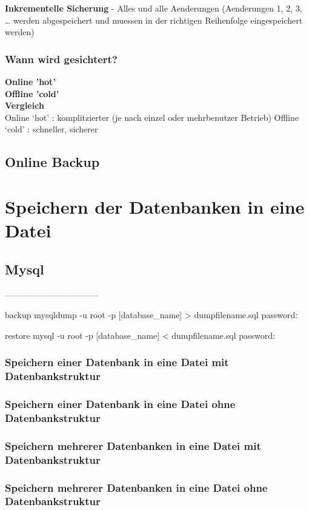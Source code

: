 \documentclass[10pt]{article}
\begin{document}
\textbf{Inkrementelle Sicherung} 
- Alles und alle Aenderungen
(Aenderungen 1, 2, 3, … werden abgespeichert und muessen in der richtigen Reihenfolge eingespeichert werden)
\subsubsection{Wann wird gesichtert?}

\textbf{Online 'hot'} \\
\textbf{Offline 'cold'} \\
\textbf{Vergleich} \\
Online ‘hot’ : komplitzierter (je nach einzel oder mehrbenutzer Betrieb)
Offline ‘cold’ :  schneller, sicherer





\subsection{Online Backup}

\section{Speichern der Datenbanken in eine Datei}
\subsection{Mysql}



---------------------------------
	


backup mysqldump -u root -p [database\_name] > dumpfilename.sql
password:

restore mysql -u root -p [database\_name] < dumpfilename.sql
password:
\subsubsection{Speichern einer Datenbank in eine Datei mit Datenbankstruktur}
\subsubsection{Speichern einer Datenbank in eine Datei ohne Datenbankstruktur}
\subsubsection{Speichern mehrerer Datenbanken in eine Datei mit Datenbankstruktur}
\subsubsection{Speichern mehrerer Datenbanken in eine Datei ohne Datenbankstruktur}
\end{document}
